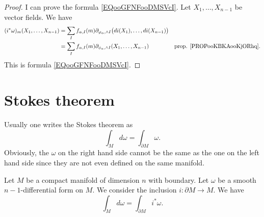 \begin{proof}
	I can prove the formula \eqref{EQooGFNFooDMSVcI}. Let \( X_1,\ldots,X_{n-1}\) be vector fields. We have
	\begin{subequations}
		\begin{align}
			(i^*\omega)_m(X_1,\ldots,X_{n-1}) & =\sum_If_{\alpha,I}(m)\partial_{\varphi_{\alpha},\wedge I}\big( di(X_1),\ldots,di(X_{n-1}) \big)                                          \\
			                                  & =\sum_If_{\alpha,I}(m)\partial_{\phi_{\alpha}, \wedge I}(X_1,\ldots,X_{n-1})                     & \text{prop. \ref{PROPooKBKAooKjORhq}}.
		\end{align}
	\end{subequations}
	This is formula \eqref{EQooGFNFooDMSVcI}.
\end{proof}

\section{Stokes theorem}

Usually one writes the Stokes theorem as
\begin{equation}
	\int_Md\omega=\int_{\partial M}\omega.
\end{equation}
Obviously, the \( \omega\) on the right hand side cannot be the same as the one on the left hand side since they are not even defined on the same manifold.

\begin{theorem}	\label{THOooFTNKooQzBPIN}
	Let \( M\) be a compact manifold of dimension \( n\) with boundary. Let \( \omega\) be a smooth \( n-1\)-differential form on \( M\). We consider the inclusion \(i \colon \partial M\to M  \). We have
	\begin{equation}
		\int_Md\omega=\int_{\partial M} i^*\omega.
	\end{equation}
\end{theorem}

